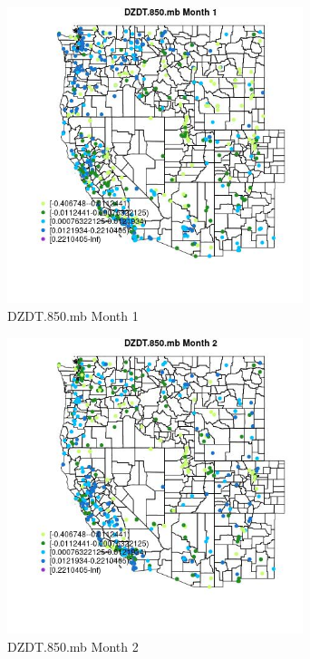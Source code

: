 \begin{figure} 
\centering  
\includegraphics[width=0.77\textwidth]{Code_Outputs/Report_ML_input_PM25_Step4_part_e_de_duplicated_aves_compiled_2019-05-18wNAs_MapObsMo1DZDT850mb.jpg} 
\caption{\label{fig:Report_ML_input_PM25_Step4_part_e_de_duplicated_aves_compiled_2019-05-18wNAsMapObsMo1DZDT850mb}DZDT.850.mb Month 1} 
\end{figure} 
 

\begin{figure} 
\centering  
\includegraphics[width=0.77\textwidth]{Code_Outputs/Report_ML_input_PM25_Step4_part_e_de_duplicated_aves_compiled_2019-05-18wNAs_MapObsMo2DZDT850mb.jpg} 
\caption{\label{fig:Report_ML_input_PM25_Step4_part_e_de_duplicated_aves_compiled_2019-05-18wNAsMapObsMo2DZDT850mb}DZDT.850.mb Month 2} 
\end{figure} 
 

